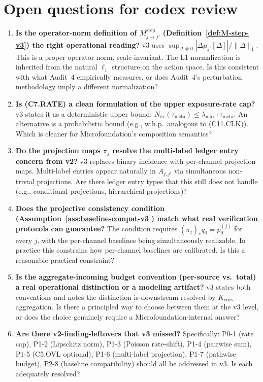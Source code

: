 \documentclass{article}
\newcommand{\Nev}{N_{\mathrm{ev}}}
\newcommand{\lammax}{\lambda_{\max}}
\newcommand{\taumeta}{\tau_{\mathrm{meta}}}
\begin{document}
\section{Open questions for codex review}

\begin{enumerate}
\item \textbf{Is the operator-norm definition of
  $M_{j \to j'}^{\mathrm{step}}$
  (Definition~\ref{def:M-step-v3}) the right operational reading?}
  v3 uses $\sup_{\Delta \neq 0} |\Delta\mu_{j'}[\Delta]|/\|\Delta\|_1$.
  This is a proper operator norm, scale-invariant.  The L1
  normalization is inherited from the natural $\ell_1$ structure
  on the action space.  Is this consistent with what Audit~4
  empirically measures, or does Audit~4's perturbation methodology
  imply a different normalization?

\item \textbf{Is (C7.RATE) a clean formulation of the upper
  exposure-rate cap?}  v3 states it as a deterministic upper
  bound: $\Nev(\taumeta) \leq \lammax \cdot \taumeta$.  An
  alternative is a probabilistic bound (e.g., w.h.p.\ analogous to
  (C11.CLK)).  Which is cleaner for Microfoundation's composition
  semantics?

\item \textbf{Do the projection maps $\pi_j$ resolve the multi-label
  ledger entry concern from v2?}  v3 replaces binary incidence with
  per-channel projection maps.  Multi-label entries appear
  naturally in $A_{j, j'}$ via simultaneous non-trivial
  projections.  Are there ledger entry types that this still does
  not handle (e.g., conditional projections, hierarchical
  projections)?

\item \textbf{Does the projective consistency condition
  (Assumption~\ref{ass:baseline-compat-v3}) match what real
  verification protocols can guarantee?}  The condition requires
  $(\pi_j)_* q_0 = p_0^{(j)}$ for every $j$, with the per-channel
  baselines being simultaneously realizable.  In practice this
  constrains how per-channel baselines are calibrated.  Is this a
  reasonable practical constraint?

\item \textbf{Is the aggregate-incoming budget convention
  (per-source vs.\ total) a real operational distinction or a
  modeling artifact?}  v3 states both conventions and notes the
  distinction is downstream-resolved by $K_{\mathrm{coev}}$
  aggregation.  Is there a principled way to choose between them
  at the v3 level, or does the choice genuinely require a
  Microfoundation-internal answer?

\item \textbf{Are there v2-finding-leftovers that v3 missed?}
  Specifically: P0-1 (rate cap), P1-2 (Lipschitz norm), P1-3
  (Poisson rate-shift), P1-4 (pairwise sum), P1-5 (C5.OVL
  optional), P1-6 (multi-label projection), P1-7 (pathwise
  budget), P2-8 (baseline compatibility) should all be addressed
  in v3.  Is each adequately resolved?
\end{enumerate}
\end{document}

